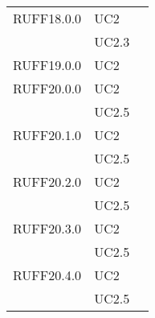 \begin{center}
\begin{longtable}{lp{}l}
RUFF18.0.0 & UC2 \\
 & UC2.3 \\
RUFF19.0.0 & UC2 \\
RUFF20.0.0 & UC2 \\
 & UC2.5 \\
RUFF20.1.0 & UC2 \\
 & UC2.5 \\
RUFF20.2.0 & UC2 \\
 & UC2.5 \\
RUFF20.3.0 & UC2 \\
 & UC2.5 \\
RUFF20.4.0 & UC2 \\
 & UC2.5 \\
\bottomrule
\end{longtable}
\end{center}
